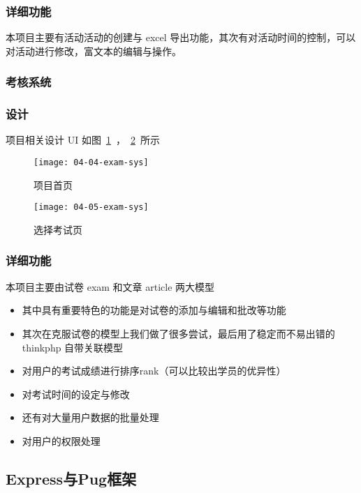 \subsubsection*{详细功能}

本项目主要有活动活动的创建与 excel 导出功能，其次有对活动时间的控制，可以对活动进行修改，富文本的编辑与操作。

\subsubsection{考核系统}

\subsubsection*{设计}

项目相关设计 UI 如图~\ref{fig:04-04-exam-sys}~，~\ref{fig:04-05-exam-sys}~所示

\begin{figure}[htbp]
\centering
\texttt{[image: 04-04-exam-sys]}
\caption{项目首页}
\label{fig:04-04-exam-sys}
\end{figure}

\begin{figure}[htbp]
\centering
\texttt{[image: 04-05-exam-sys]}
\caption{选择考试页}
\label{fig:04-05-exam-sys}
\end{figure}

\subsubsection*{详细功能}

本项目主要由试卷 exam 和文章 article 两大模型

\begin{itemize}
  \item 其中具有重要特色的功能是对试卷的添加与编辑和批改等功能
  \item 其次在克服试卷的模型上我们做了很多尝试，最后用了稳定而不易出错的 thinkphp 自带关联模型
  \item 对用户的考试成绩进行排序rank（可以比较出学员的优异性）
  \item 对考试时间的设定与修改
  \item 还有对大量用户数据的批量处理
  \item 对用户的权限处理
\end{itemize}

\subsection{Express与Pug框架}


